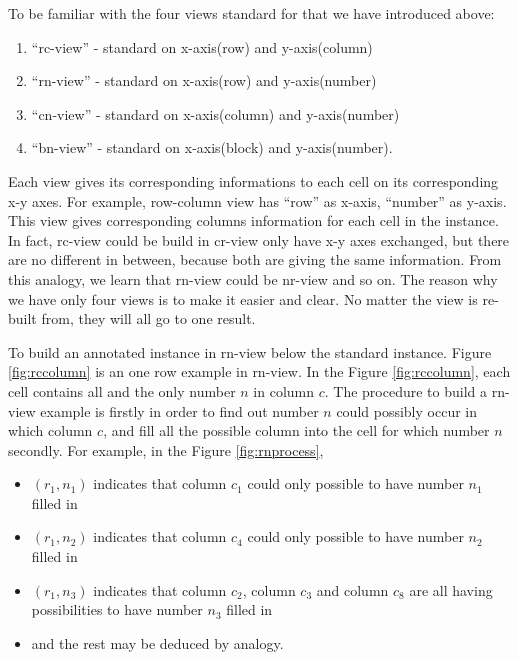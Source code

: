 \documentclass[11pt]{report}
\begin{document}
To be familiar with the four views standard for that we have introduced above:
\begin{enumerate}
\item ``rc-view'' - standard on x-axis(row) and y-axis(column)
\item ``rn-view'' - standard on x-axis(row) and y-axis(number)
\item ``cn-view'' - standard on x-axis(column) and y-axis(number)
\item ``bn-view'' - standard on x-axis(block) and y-axis(number).
\end{enumerate}

Each view gives its corresponding informations to each cell on its corresponding x-y axes. For example, row-column view has ``row'' as x-axis, ``number'' as y-axis. This view gives corresponding columns information for each cell in the instance. In fact, rc-view could be build in cr-view only have x-y axes exchanged, but there are no different in between, because both are giving the same information. From this analogy, we learn that rn-view could be nr-view and so on. The reason why we have only four views is to make it easier and clear. No matter the view is re-built from, they will all go to one result.

To build an annotated instance in rn-view below the standard instance. Figure \ref{fig:rccolumn} is an one row example in rn-view. In the Figure \ref{fig:rccolumn}, each cell contains all and the only number $n$ in column $c$. The procedure to build a rn-view example is firstly in order to find out number $n$ could possibly occur in which column $c$, and fill all the possible column into the cell for which number $n$ secondly. 
For example, in the Figure \ref{fig:rnprocess},
\begin{itemize}
\item $(r_{1}, n_{1})$ indicates that column $c_{1}$ could only possible to have number $n_{1}$ filled in
\item $(r_{1}, n_{2})$ indicates that column $c_{4}$ could only possible to have number $n_{2}$ filled in
\item $(r_{1}, n_{3})$ indicates that column $c_{2}$, column $c_{3}$ and column $c_{8}$ are all having possibilities to have number $n_{3}$ filled in
\item and the rest may be deduced by analogy.
\end{itemize}
\end{document}
